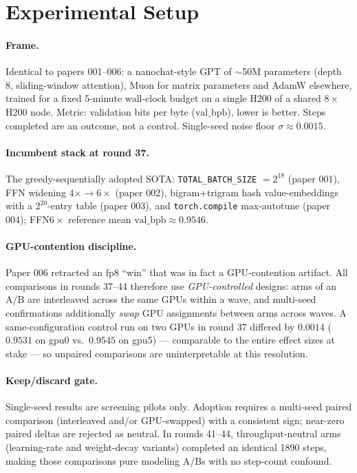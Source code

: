 \documentclass{article}
\newcommand{\valbpb}{\mathrm{val\_bpb}}
\begin{document}
\section{Experimental Setup}
\label{sec:setup}

\paragraph{Frame.} Identical to papers 001--006: a nanochat-style GPT \cite{karpathy2025nanochat} of $\sim$50M parameters (depth 8, sliding-window attention), Muon for matrix parameters \cite{jordan2024muon} and AdamW elsewhere, trained for a fixed 5-minute wall-clock budget on a single H200 of a shared $8\times$H200 node. Metric: validation bits per byte ($\valbpb$), lower is better. Steps completed are an outcome, not a control. Single-seed noise floor $\sigma \approx 0.0015$.

\paragraph{Incumbent stack at round 37.} The greedy-sequentially adopted SOTA: \texttt{TOTAL\_BATCH\_SIZE} $= 2^{18}$ (paper 001), FFN widening $4\times \rightarrow 6\times$ (paper 002), bigram+trigram hash value-embeddings with a $2^{20}$-entry table (paper 003), and \texttt{torch.compile} max-autotune (paper 004); FFN$6\times$ reference mean $\valbpb \approx 0.9546$.

\paragraph{GPU-contention discipline.} Paper 006 \cite{ophis2026retraction} retracted an fp8 ``win'' that was in fact a GPU-contention artifact. All comparisons in rounds 37--44 therefore use \emph{GPU-controlled} designs: arms of an A/B are interleaved across the same GPUs within a wave, and multi-seed confirmations additionally \emph{swap} GPU assignments between arms across waves. A same-configuration control run on two GPUs in round 37 differed by $0.0014$ ($0.9531$ on gpu0 vs.\ $0.9545$ on gpu5) --- comparable to the entire effect sizes at stake --- so unpaired comparisons are uninterpretable at this resolution.

\paragraph{Keep/discard gate.} Single-seed results are screening pilots only. Adoption requires a multi-seed paired comparison (interleaved and/or GPU-swapped) with a consistent sign; near-zero paired deltas are rejected as neutral. In rounds 41--44, throughput-neutral arms (learning-rate and weight-decay variants) completed an identical 1890 steps, making those comparisons pure modeling A/Bs with no step-count confound.
\end{document}
